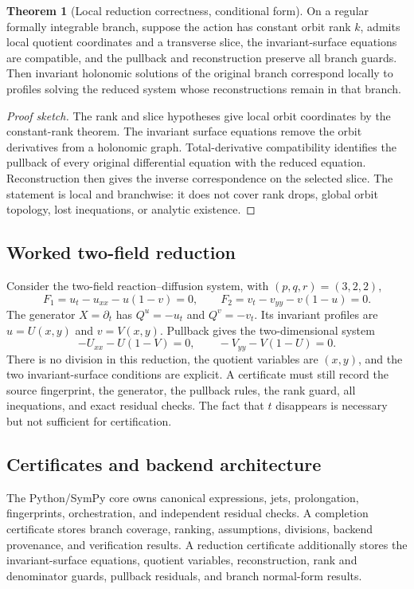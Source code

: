 \documentclass[11pt]{article}
\theoremstyle{definition}
\newtheorem{theorem}[definition]{Theorem}
\theoremstyle{remark}
\begin{document}
\begin{theorem}[Local reduction correctness, conditional form]
On a regular formally integrable branch, suppose the action has constant orbit rank $k$, admits local
quotient coordinates and a transverse slice, the invariant-surface equations are compatible, and the
pullback and reconstruction preserve all branch guards. Then invariant holonomic solutions of the original
branch correspond locally to profiles solving the reduced system whose reconstructions remain in that branch.
\end{theorem}

\begin{proof}[Proof sketch]
The rank and slice hypotheses give local orbit coordinates by the constant-rank theorem. The invariant
surface equations remove the orbit derivatives from a holonomic graph. Total-derivative compatibility
identifies the pullback of every original differential equation with the reduced equation. Reconstruction
then gives the inverse correspondence on the selected slice. The statement is local and branchwise: it
does not cover rank drops, global orbit topology, lost inequations, or analytic existence.
\end{proof}

\subsection{Worked two-field reduction}

Consider the two-field reaction--diffusion system, with $(p,q,r)=(3,2,2)$,
\[
 F_1=u_t-u_{xx}-u(1-v)=0,\qquad
 F_2=v_t-v_{yy}-v(1-u)=0.
\]
The generator $X=\partial_t$ has $Q^u=-u_t$ and $Q^v=-v_t$. Its invariant profiles are
$u=U(x,y)$ and $v=V(x,y)$. Pullback gives the two-dimensional system
\[
 -U_{xx}-U(1-V)=0,\qquad -V_{yy}-V(1-U)=0.
\]
There is no division in this reduction, the quotient variables are $(x,y)$, and the two invariant-surface
conditions are explicit. A certificate must still record the source fingerprint, the generator, the
pullback rules, the rank guard, all inequations, and exact residual checks. The fact that $t$ disappears is
necessary but not sufficient for certification.

\subsection{Certificates and backend architecture}

The Python/SymPy core owns canonical expressions, jets, prolongation, fingerprints, orchestration, and
independent residual checks. A completion certificate stores branch coverage, ranking, assumptions,
divisions, backend provenance, and verification results. A reduction certificate additionally stores the
invariant-surface equations, quotient variables, reconstruction, rank and denominator guards, pullback
residuals, and branch normal-form results.
\end{document}
